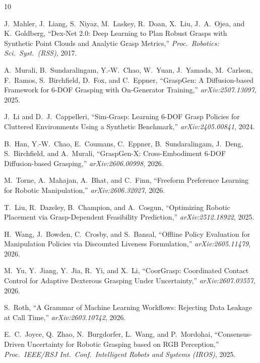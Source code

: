 \documentclass[journal]{IEEEtran}
\begin{document}
\begin{thebibliography}{10}

J.~Mahler, J.~Liang, S.~Niyaz, M.~Laskey, R.~Doan, X.~Liu, J.~A.~Ojea,
and K.~Goldberg,
``Dex-Net 2.0: Deep Learning to Plan Robust Grasps with Synthetic
  Point Clouds and Analytic Grasp Metrics,''
\emph{Proc.\ Robotics: Sci.\ Syst.\ (RSS)}, 2017.

A.~Murali, B.~Sundaralingam, Y.-W.~Chao, W.~Yuan, J.~Yamada,
M.~Carlson, F.~Ramos, S.~Birchfield, D.~Fox, and C.~Eppner,
``GraspGen: A Diffusion-based Framework for 6-DOF Grasping with
  On-Generator Training,''
\emph{arXiv:2507.13097}, 2025.

J.~Li and D.~J.~Cappelleri,
``Sim-Grasp: Learning 6-DOF Grasp Policies for Cluttered Environments
  Using a Synthetic Benchmark,''
\emph{arXiv:2405.00841}, 2024.

B.~Han, Y.-W.~Chao, E.~Coumans, C.~Eppner, B.~Sundaralingam,
J.~Deng, S.~Birchfield, and A.~Murali,
``GraspGen-X: Cross-Embodiment 6-DOF Diffusion-based Grasping,''
\emph{arXiv:2606.00998}, 2026.

M.~Torne, A.~Mahajan, A.~Bhat, and C.~Finn,
``Freeform Preference Learning for Robotic Manipulation,''
\emph{arXiv:2606.32027}, 2026.

T.~Liu, R.~Dazeley, B.~Champion, and A.~Cosgun,
``Optimizing Robotic Placement via Grasp-Dependent Feasibility
  Prediction,''
\emph{arXiv:2512.18922}, 2025.

H.~Wang, J.~Bowden, C.~Crosby, and S.~Bansal,
``Offline Policy Evaluation for Manipulation Policies via Discounted
  Liveness Formulation,''
\emph{arXiv:2605.11479}, 2026.

M.~Yu, Y.~Jiang, Y.~Jia, R.~Yi, and X.~Li,
``CoorGrasp: Coordinated Contact Control for Adaptive Dexterous
  Grasping Under Uncertainty,''
\emph{arXiv:2607.03557}, 2026.

S.~Roth,
``A Grammar of Machine Learning Workflows: Rejecting Data Leakage at
  Call Time,''
\emph{arXiv:2603.10742}, 2026.

E.~C.~Joyce, Q.~Zhao, N.~Burgdorfer, L.~Wang, and P.~Mordohai,
``Consensus-Driven Uncertainty for Robotic Grasping based on RGB
  Perception,''
\emph{Proc.\ IEEE/RSJ Int.\ Conf.\ Intelligent Robots and Systems (IROS)},
2025.


\end{thebibliography}
\end{document}
